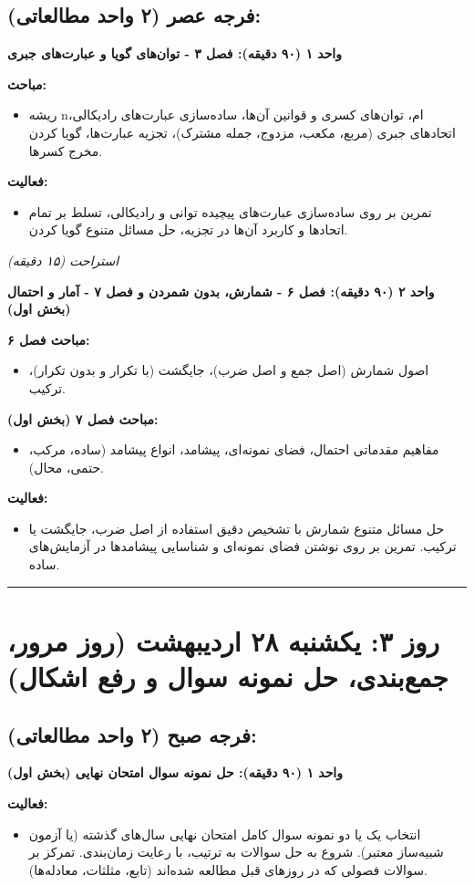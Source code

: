 \documentclass[12pt,a4paper]{article}
\newcommand{\studyunit}[1]{\par\medskip\noindent\textbf{#1}\par\nopagebreak}
\newcommand{\topics}{\par\medskip\noindent\textbf{مباحث:}\begin{itemize}[nosep,after=\vspace{-0.5\baselineskip}]}
\newcommand{\activities}{\par\medskip\noindent\textbf{فعالیت:}\begin{itemize}[nosep,after=\vspace{-0.5\baselineskip}]}
\newcommand{\breaktime}[1]{\par\smallskip\centerline{\textit{#1}}\smallskip}
\begin{document}
\subsection*{فرجه عصر (۲ واحد مطالعاتی):}
    \studyunit{واحد ۱ (۹۰ دقیقه): فصل ۳ - توان‌های گویا و عبارت‌های جبری}
        \topics
            \item ریشه nام، توان‌های کسری و قوانین آن‌ها، ساده‌سازی عبارت‌های رادیکالی، اتحادهای جبری (مربع، مکعب، مزدوج، جمله مشترک)، تجزیه عبارت‌ها، گویا کردن مخرج کسرها.
        \end{itemize}
        \activities
            \item تمرین بر روی ساده‌سازی عبارت‌های پیچیده توانی و رادیکالی، تسلط بر تمام اتحادها و کاربرد آن‌ها در تجزیه، حل مسائل متنوع گویا کردن.
        \end{itemize}

    \breaktime{استراحت (۱۵ دقیقه)}

    \studyunit{واحد ۲ (۹۰ دقیقه): فصل ۶ - شمارش، بدون شمردن و فصل ۷ - آمار و احتمال (بخش اول)}
        \textbf{مباحث فصل ۶:}
        \begin{itemize}[nosep,after=\vspace{-0.5\baselineskip}]
            \item اصول شمارش (اصل جمع و اصل ضرب)، جایگشت (با تکرار و بدون تکرار)، ترکیب.
        \end{itemize}
        \textbf{مباحث فصل ۷ (بخش اول):}
        \begin{itemize}[nosep,after=\vspace{-0.5\baselineskip}]
            \item مفاهیم مقدماتی احتمال، فضای نمونه‌ای، پیشامد، انواع پیشامد (ساده، مرکب، حتمی، محال).
        \end{itemize}
        \activities
            \item حل مسائل متنوع شمارش با تشخیص دقیق استفاده از اصل ضرب، جایگشت یا ترکیب. تمرین بر روی نوشتن فضای نمونه‌ای و شناسایی پیشامدها در آزمایش‌های ساده.
        \end{itemize}

\rule{\linewidth}{0.4pt}\vspace{1em} %

\section*{روز ۳: یکشنبه ۲۸ اردیبهشت (روز مرور، جمع‌بندی، حل نمونه سوال و رفع اشکال)}

\subsection*{فرجه صبح (۲ واحد مطالعاتی):}
    \studyunit{واحد ۱ (۹۰ دقیقه): حل نمونه سوال امتحان نهایی (بخش اول)}
        \activities
            \item انتخاب یک یا دو نمونه سوال کامل امتحان نهایی سال‌های گذشته (یا آزمون شبیه‌ساز معتبر). شروع به حل سوالات به ترتیب، با رعایت زمان‌بندی. تمرکز بر سوالات فصولی که در روزهای قبل مطالعه شده‌اند (تابع، مثلثات، معادله‌ها).
        \end{itemize}
\end{document}
